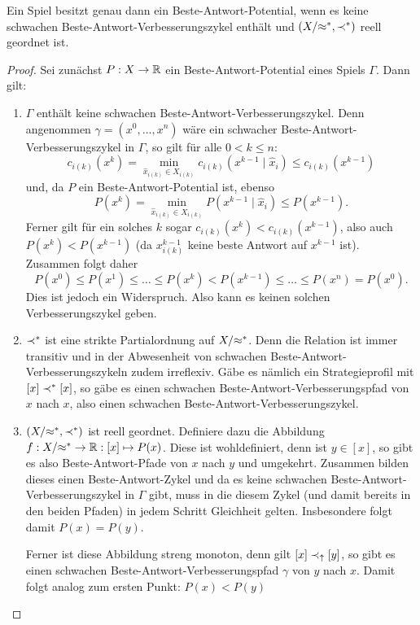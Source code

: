 \begin{satz}
	Ein Spiel besitzt genau dann ein Beste-Antwort-Potential, wenn es keine schwachen Beste-Antwort-Verbesserungszykel enthält und $(X/{\approx^\ast}, \prec^\ast)$ reell geordnet ist.
\end{satz}

\begin{proof}
	Sei zunächst $P: X \to \mathbb{R}$ ein Beste-Antwort-Potential eines Spiels $\Gamma$. Dann gilt:
	\begin{enumerate}
		\item $\Gamma$ enthält keine schwachen Beste-Antwort-Verbesserungszykel. Denn angenommen $\gamma = (x^0, \dots, x^n)$ wäre ein schwacher Beste-Antwort-Verbesserungszykel in $\Gamma$, so gilt für alle $0 < k \leq n$:
			\[c_{i(k)}(x^k) = \min_{\hat{x}_{i(k)} \in X_{i(k)}} c_{i(k)}(x^{k-1} \mid \hat{x}_i) \leq c_{i(k)}(x^{k-1})\]
		und, da $P$ ein Beste-Antwort-Potential ist, ebenso 
			\[P(x^k) = \min_{\hat{x}_{i(k)} \in X_{i(k)}} P(x^{k-1} \mid \hat{x}_i) \leq P(x^{k-1}).\]
		Ferner gilt für ein solches $k$ sogar $c_{i(k)}(x^k) < c_{i(k)}(x^{k-1})$, also auch $P(x^k) < P(x^{k-1})$ (da $x^{k-1}_{i(k)}$ keine beste Antwort auf $x^{k-1}$ ist). Zusammen folgt daher
			\[P(x^0) \leq P(x^1) \leq \dots \leq P(x^k) < P(x^{k-1}) \leq \dots \leq P(x^n) = P(x^0).\]
		Dies ist jedoch ein Widerspruch. Also kann es keinen solchen Verbesserungszykel geben.
		
		\item $\prec^\ast$ ist eine strikte Partialordnung auf $X/{\approx^\ast}$. Denn die Relation ist immer transitiv und in der Abwesenheit von schwachen Beste-Antwort-Verbesserungszykeln zudem irreflexiv. Gäbe es nämlich ein Strategieprofil mit $[x] \prec^\ast [x]$, so gäbe es einen schwachen Beste-Antwort-Verbesserungspfad von $x$ nach $x$, also einen schwachen Beste-Antwort-Verbesserungszykel.
		
		\item $(X/{\approx^\ast}, \prec^\ast)$ ist reell geordnet. Definiere dazu die Abbildung $f: X/{\approx^\ast} \to \mathbb{R}: [x] \mapsto P(x)$. Diese ist wohldefiniert, denn ist $y \in [x]$, so gibt es also Beste-Antwort-Pfade von $x$ nach $y$ und umgekehrt. Zusammen bilden dieses einen Beste-Antwort-Zykel und da es keine schwachen Beste-Antwort-Verbesserungszykel in $\Gamma$ gibt, muss in die diesem Zykel (und damit bereits in den beiden Pfaden) in jedem Schritt Gleichheit gelten. Insbesondere folgt damit $P(x) = P(y)$.
		
		Ferner ist diese Abbildung streng monoton, denn gilt $[x] \prec_\uparrow [y]$, so gibt es einen schwachen Beste-Antwort-Verbesserungspfad $\gamma$ von $y$ nach $x$. Damit folgt analog zum ersten Punkt: $P(x) < P(y)$
	\end{enumerate}
	

\end{proof}
